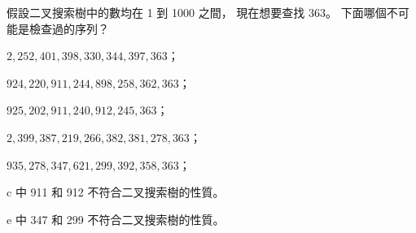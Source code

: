 \startEXERCISE
假設二叉搜索樹中的數均在 1 到 1000 之間，
現在想要查找 363。
下面哪個不可能是檢查過的序列？
\startigBase[a]
\item $2,252,401,398,330,344,397,363$；
\item $924,220,911,244,898,258,362,363$；
\item $925,202,911,240,912,245,363$；
\item $2,399,387,219,266,382,381,278,363$；
\item $935,278,347,621,299,392,358,363$；
\stopigBase
\stopEXERCISE

\startANSWER
c 中 911 和 912 不符合二叉搜索樹的性質。

e 中 347 和 299 不符合二叉搜索樹的性質。
\stopANSWER
